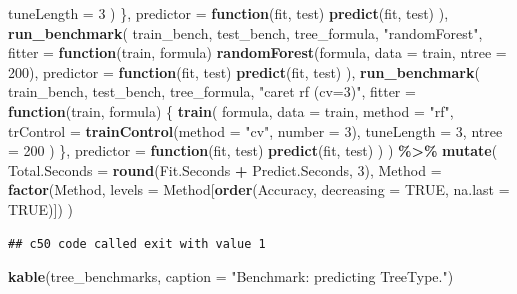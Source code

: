 \documentclass[
  11pt,
]{article}
\newenvironment{Shaded}{\begin{snugshade}}{\end{snugshade}}
\newcommand{\AttributeTok}[1]{\textcolor[rgb]{0.13,0.29,0.53}{#1}}
\newcommand{\ConstantTok}[1]{\textcolor[rgb]{0.56,0.35,0.01}{#1}}
\newcommand{\ControlFlowTok}[1]{\textcolor[rgb]{0.13,0.29,0.53}{\textbf{#1}}}
\newcommand{\DecValTok}[1]{\textcolor[rgb]{0.00,0.00,0.81}{#1}}
\newcommand{\FunctionTok}[1]{\textcolor[rgb]{0.13,0.29,0.53}{\textbf{#1}}}
\newcommand{\NormalTok}[1]{#1}
\newcommand{\SpecialCharTok}[1]{\textcolor[rgb]{0.81,0.36,0.00}{\textbf{#1}}}
\newcommand{\StringTok}[1]{\textcolor[rgb]{0.31,0.60,0.02}{#1}}
\begin{document}
\begin{Shaded}
\begin{Highlighting}[]
        \AttributeTok{tuneLength =} \DecValTok{3}
\NormalTok{      )}
\NormalTok{    \},}
    \AttributeTok{predictor =} \ControlFlowTok{function}\NormalTok{(fit, test) }\FunctionTok{predict}\NormalTok{(fit, test)}
\NormalTok{  ),}
  \FunctionTok{run\_benchmark}\NormalTok{(}
\NormalTok{    train\_bench, test\_bench, tree\_formula, }\StringTok{"randomForest"}\NormalTok{,}
    \AttributeTok{fitter =} \ControlFlowTok{function}\NormalTok{(train, formula) }\FunctionTok{randomForest}\NormalTok{(formula, }\AttributeTok{data =}\NormalTok{ train, }\AttributeTok{ntree =} \DecValTok{200}\NormalTok{),}
    \AttributeTok{predictor =} \ControlFlowTok{function}\NormalTok{(fit, test) }\FunctionTok{predict}\NormalTok{(fit, test)}
\NormalTok{  ),}
  \FunctionTok{run\_benchmark}\NormalTok{(}
\NormalTok{    train\_bench, test\_bench, tree\_formula, }\StringTok{"caret rf (cv=3)"}\NormalTok{,}
    \AttributeTok{fitter =} \ControlFlowTok{function}\NormalTok{(train, formula) \{}
      \FunctionTok{train}\NormalTok{(}
\NormalTok{        formula, }\AttributeTok{data =}\NormalTok{ train, }\AttributeTok{method =} \StringTok{"rf"}\NormalTok{,}
        \AttributeTok{trControl =} \FunctionTok{trainControl}\NormalTok{(}\AttributeTok{method =} \StringTok{"cv"}\NormalTok{, }\AttributeTok{number =} \DecValTok{3}\NormalTok{),}
        \AttributeTok{tuneLength =} \DecValTok{3}\NormalTok{,}
        \AttributeTok{ntree =} \DecValTok{200}
\NormalTok{      )}
\NormalTok{    \},}
    \AttributeTok{predictor =} \ControlFlowTok{function}\NormalTok{(fit, test) }\FunctionTok{predict}\NormalTok{(fit, test)}
\NormalTok{  )}
\NormalTok{) }\SpecialCharTok{\%\textgreater{}\%}
  \FunctionTok{mutate}\NormalTok{(}
    \AttributeTok{Total.Seconds =} \FunctionTok{round}\NormalTok{(Fit.Seconds }\SpecialCharTok{+}\NormalTok{ Predict.Seconds, }\DecValTok{3}\NormalTok{),}
    \AttributeTok{Method =} \FunctionTok{factor}\NormalTok{(Method, }\AttributeTok{levels =}\NormalTok{ Method[}\FunctionTok{order}\NormalTok{(Accuracy, }\AttributeTok{decreasing =} \ConstantTok{TRUE}\NormalTok{, }\AttributeTok{na.last =} \ConstantTok{TRUE}\NormalTok{)])}
\NormalTok{  )}
\end{Highlighting}
\end{Shaded}

\begin{verbatim}
## c50 code called exit with value 1
\end{verbatim}

\begin{Shaded}
\begin{Highlighting}[]
\FunctionTok{kable}\NormalTok{(tree\_benchmarks, }\AttributeTok{caption =} \StringTok{"Benchmark: predicting TreeType."}\NormalTok{)}
\end{Highlighting}
\end{Shaded}
\end{document}

